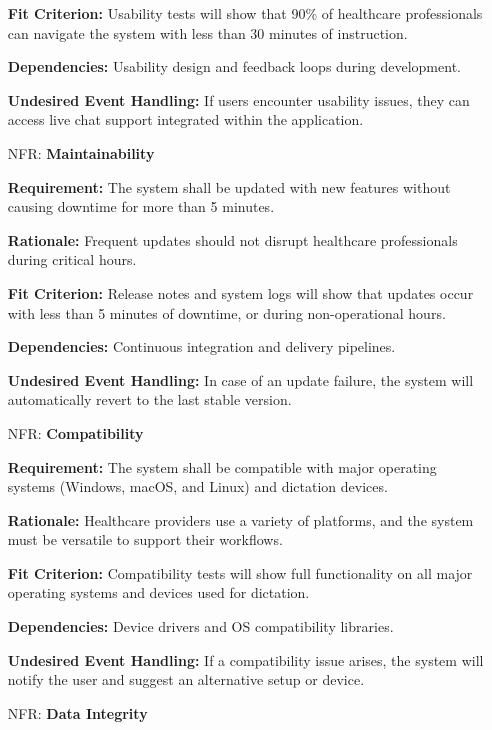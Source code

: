 \documentclass[12pt]{article}
\newcounter{nfrnum} %
\begin{document}
\begin{itemize}
    \textbf{Fit Criterion:} Usability tests will show that 90\% of healthcare professionals can navigate the system with less than 30 minutes of instruction.  
  
    \textbf{Dependencies:} Usability design and feedback loops during development.  
  
    \textbf{Undesired Event Handling:} If users encounter usability issues, they can access live chat support integrated within the application.

\item[NFR\refstepcounter{nfrnum}\thenfrnum \label{NFR_Maintainability}:] \textbf{Maintainability}  

    \textbf{Requirement:} The system shall be updated with new features without causing downtime for more than 5 minutes.  
  
    \textbf{Rationale:} Frequent updates should not disrupt healthcare professionals during critical hours.  
  
    \textbf{Fit Criterion:} Release notes and system logs will show that updates occur with less than 5 minutes of downtime, or during non-operational hours.  
  
    \textbf{Dependencies:} Continuous integration and delivery pipelines.  
  
    \textbf{Undesired Event Handling:} In case of an update failure, the system will automatically revert to the last stable version.

\item[NFR\refstepcounter{nfrnum}\thenfrnum \label{NFR_Compatibility}:] \textbf{Compatibility}  

    \textbf{Requirement:} The system shall be compatible with major operating systems (Windows, macOS, and Linux) and dictation devices.  
  
    \textbf{Rationale:} Healthcare providers use a variety of platforms, and the system must be versatile to support their workflows.  
  
    \textbf{Fit Criterion:} Compatibility tests will show full functionality on all major operating systems and devices used for dictation.  
  
    \textbf{Dependencies:} Device drivers and OS compatibility libraries.  
  
    \textbf{Undesired Event Handling:} If a compatibility issue arises, the system will notify the user and suggest an alternative setup or device.

\item[NFR\refstepcounter{nfrnum}\thenfrnum \label{NFR_DataIntegrity}:] \textbf{Data Integrity}  


\end{itemize}
\end{document}
